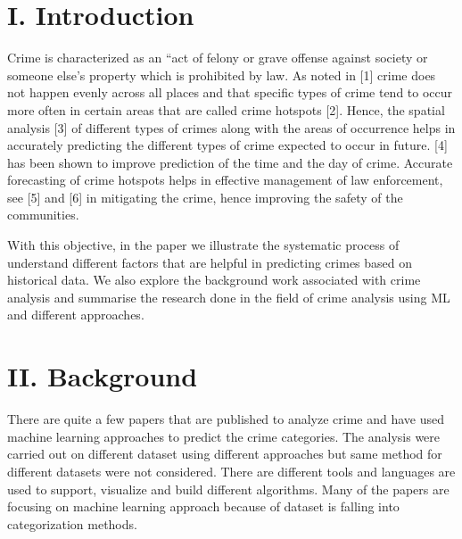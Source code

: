 \documentclass[11 pt,conference,final,]{IEEEtran}
\begin{document}



\maketitle


%
\IEEEpeerreviewmaketitle


\section{I. Introduction}\label{i.-introduction}

Crime is characterized as an ``act of felony or grave offense against
society or someone else's property which is prohibited by law. As noted
in {[}1{]} crime does not happen evenly across all places and that
specific types of crime tend to occur more often in certain areas that
are called crime hotspots {[}2{]}. Hence, the spatial analysis {[}3{]}
of different types of crimes along with the areas of occurrence helps in
accurately predicting the different types of crime expected to occur in
future. {[}4{]} has been shown to improve prediction of the time and the
day of crime. Accurate forecasting of crime hotspots helps in effective
management of law enforcement, see {[}5{]} and {[}6{]} in mitigating the
crime, hence improving the safety of the communities.

With this objective, in the paper we illustrate the systematic process
of understand different factors that are helpful in predicting crimes
based on historical data. We also explore the background work associated
with crime analysis and summarise the research done in the field of
crime analysis using ML and different approaches.

\section{II. Background}\label{ii.-background}

There are quite a few papers that are published to analyze crime and
have used machine learning approaches to predict the crime categories.
The analysis were carried out on different dataset using different
approaches but same method for different datasets were not considered.
There are different tools and languages are used to support, visualize
and build different algorithms. Many of the papers are focusing on
machine learning approach because of dataset is falling into
categorization methods.
\end{document}
